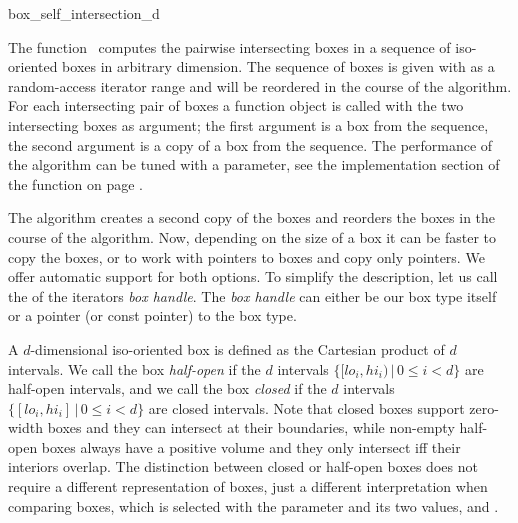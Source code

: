 

\begin{ccRefFunction}{box_self_intersection_d}

\ccDefinition
  
The function \ccRefName\ computes the pairwise intersecting boxes
in a sequence of iso-oriented boxes in arbitrary dimension.
The sequence of boxes is given with as a random-access iterator
range and will be reordered in the course of the algorithm. For each
intersecting pair of boxes a  function object is called
with the two intersecting boxes as argument; the first argument is a
box from the sequence, the second argument is a copy of a box from the
sequence.  The performance of the algorithm can be tuned with a
 parameter, see the implementation section of the
 function on page
\pageref{ccRef_CGAL::box_intersection_d}.  

The algorithm creates a second copy of the boxes and reorders the
boxes in the course of the algorithm. Now, depending on the size of a
box it can be faster to copy the boxes, or to work with pointers to
boxes and copy only pointers. We offer automatic support for both
options. To simplify the description, let us call the 
of the iterators \emph{box handle}.  The \emph{box handle\/} can
either be our box type itself or a pointer (or const pointer) to the
box type.

A $d$-dimensional iso-oriented box is defined as the Cartesian product
of $d$ intervals. We call the box \emph{half-open} if the $d$
intervals $\{ [lo_i,hi_i) \,|\, 0 \leq i < d\}$ are half-open intervals,
and we call the box \emph{closed} if the $d$ intervals $\{ [lo_i,hi_i]
\,|\, 0 \leq i < d\}$ are closed intervals. Note that closed boxes support
zero-width boxes and they can intersect at their boundaries, while
non-empty half-open boxes always have a positive volume and they only
intersect iff their interiors overlap.  The distinction between closed
or half-open boxes does not require a different representation of
boxes, just a different interpretation when comparing boxes, which is
selected with the  parameter and its two values,
 and
.


\end{ccRefFunction}
